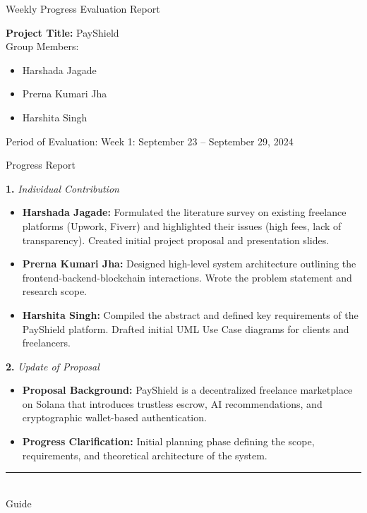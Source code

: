 \documentclass[12pt]{article}
\newcommand{\phasetitle}[1]{{\large Period of Evaluation: #1}\par\vspace{4pt}}
\newcommand{\progressreport}{{\large Progress Report}\par\vspace{4pt}}
\newcommand{\subhead}[2]{\textbf{#1.} \textit{#2}\par}
\begin{document}
\begin{center}
{\fontsize{26}{31}\selectfont Weekly Progress Evaluation Report}
\end{center}
\vspace{10pt}

\textbf{Project Title:} PayShield\\
Group Members:
\begin{itemize}[leftmargin=2em]
    \item Harshada Jagade
    \item Prerna Kumari Jha
    \item Harshita Singh
\end{itemize}

\phasetitle{Week 1: September 23 -- September 29, 2024}

\progressreport

\subhead{1}{Individual Contribution}
\begin{itemize}[leftmargin=2em]
    \item \textbf{Harshada Jagade:} Formulated the literature survey on existing freelance platforms (Upwork, Fiverr) and highlighted their issues (high fees, lack of transparency). Created initial project proposal and presentation slides.
    \item \textbf{Prerna Kumari Jha:} Designed high-level system architecture outlining the frontend-backend-blockchain interactions. Wrote the problem statement and research scope.
    \item \textbf{Harshita Singh:} Compiled the abstract and defined key requirements of the PayShield platform. Drafted initial UML Use Case diagrams for clients and freelancers.
\end{itemize}

\subhead{2}{Update of Proposal}
\begin{itemize}[leftmargin=2em]
    \item \textbf{Proposal Background:} PayShield is a decentralized freelance marketplace on Solana that introduces trustless escrow, AI recommendations, and cryptographic wallet-based authentication.
    \item \textbf{Progress Clarification:} Initial planning phase defining the scope, requirements, and theoretical architecture of the system.
\end{itemize}

\vspace{40pt}
\hspace*{0.65\textwidth}\rule{4.5cm}{0.5pt}\\
\hspace*{0.75\textwidth}Guide
\end{document}
